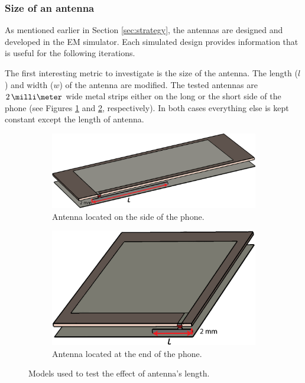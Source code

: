 \clearpage
\subsubsection{Size of an antenna}
\label{sec:antenna_size}
As mentioned earlier in Section \ref{sec:strategy}, the antennas are designed and developed in the EM simulator. Each simulated design provides information that is useful for the following iterations. 

The first interesting metric to investigate is the size of the antenna. The length ($l$) and width ($w$) of the antenna are modified. The tested antennas are $2\,\milli\meter$ wide metal strips either on the long or the short side of the phone (see Figures \ref{fig:ant_length_long} and \ref{fig:ant_length_short}, respectively). In both cases everything else is kept constant except the length of antenna. 

\begin{figure}[H]
    \centering
    \begin{subfigure}[b]{0.49\textwidth}
        \includegraphics[width=\textwidth]{img/ant_length_long.eps}
        \caption{Antenna located on the side of the phone.}
        \label{fig:ant_length_long}
    \end{subfigure}
    
    \begin{subfigure}[b]{0.49\textwidth}
        \includegraphics[width=\textwidth]{img/ant_length_short.eps}
        \caption{Antenna located at the end of the phone.}
        \label{fig:ant_length_short}
    \end{subfigure}
    \caption{Models used to test the effect of antenna's length.}
    \label{fig:ant_length_model}
\end{figure}

